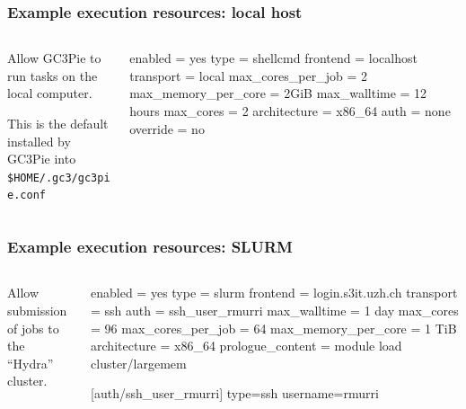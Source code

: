 \documentclass[english,serif,mathserif,usenames,dvipsnames]{beamer}
\begin{document}
\begin{frame}[fragile,label=resources]
  \frametitle{Example execution resources: local host}
  \begin{columns}[t]
    \begin{column}{0.5\textwidth}
      Allow GC3Pie to run tasks on the local computer.

      \+ This is the default installed by GC3Pie
      into \lstinline|$HOME/.gc3/gc3pie.conf| %
    \end{column}
    \begin{column}{0.5\textwidth}
  \begin{stdout}
enabled = yes
type = shellcmd
frontend = localhost
transport = local
max_cores_per_job = 2
max_memory_per_core = 2GiB
max_walltime = 12 hours
max_cores = 2
architecture = x86_64
auth = none
override = no
\end{stdout}
    \end{column}
  \end{columns}
\end{frame}


\begin{frame}[fragile]
  \frametitle{Example execution resources: SLURM}
  \begin{columns}[t]
    \begin{column}{0.5\textwidth}
      Allow submission of jobs to the ``Hydra'' cluster.
    \end{column}
    \begin{column}{0.5\textwidth}
\begin{stdout}
enabled = yes
type = slurm
frontend = login.s3it.uzh.ch
transport = ssh
auth = ssh_user_rmurri
max_walltime = 1 day
max_cores = 96
max_cores_per_job = 64
max_memory_per_core = 1 TiB
architecture = x86_64
prologue_content =
  module load cluster/largemem

[auth/ssh_user_rmurri]
type=ssh
username=rmurri
\end{stdout}
    \end{column}
  \end{columns}
\end{frame}
\end{document}
